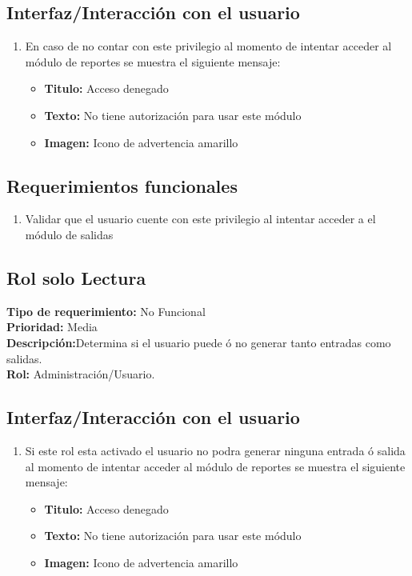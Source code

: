 \documentclass[a4paper,DIV=12]{scrreprt}
\begin{document}
\subsection*{Interfaz/Interacción con el usuario}
\begin{enumerate}
	\item{En caso de no contar con este privilegio al momento de intentar acceder al módulo de reportes se muestra el siguiente mensaje:}
	\begin{itemize}
		\item{\textbf{Titulo:} Acceso denegado}
		\item{\textbf{Texto:} No tiene autorización para usar este módulo}
		\item{\textbf{Imagen:} Icono de advertencia amarillo}
	\end{itemize}
\end{enumerate}
\subsection*{Requerimientos funcionales}
\begin{enumerate}
	\item{Validar que el usuario cuente con este privilegio al intentar acceder a el módulo de salidas}
\end{enumerate}
\newpage
\setcounter{subsection}{3}
\subsection{Rol solo Lectura}
\noindent
\textbf{Tipo de requerimiento:} No Funcional\\
\textbf{Prioridad:} Media\\
\textbf{Descripción:}Determina si el usuario puede ó no generar tanto entradas como salidas.\\
\textbf{Rol:} Administración/Usuario.
\subsection*{Interfaz/Interacción con el usuario}
\begin{enumerate}
	\item{Si este rol esta activado el usuario no podra generar ninguna entrada ó salida  al momento de intentar acceder al módulo de reportes se muestra el siguiente mensaje:}
	\begin{itemize}
		\item{\textbf{Titulo:} Acceso denegado}
		\item{\textbf{Texto:} No tiene autorización para usar este módulo}
		\item{\textbf{Imagen:} Icono de advertencia amarillo}
	\end{itemize}
\end{enumerate}
\end{document}
